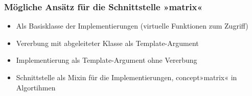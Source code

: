 \documentclass{beamer}
\begin{document}
\begin{frame}
    \frametitle{Mögliche Ansätz für die Schnittstelle »matrix«}
    \begin{itemize}
        \item Als Basisklasse der Implementierungen (virtuelle Funktionen zum Zugriff)
        \item Vererbung mit abgeleiteter Klasse als Template-Argument
        \item Implementierung als Template-Argument ohne Vererbung
        \item Schnittstelle als Mixin für die Implementierungen, concept\footnotemark »matrix« in Algortihmen
    \end{itemize}
\end{frame}
\end{document}

